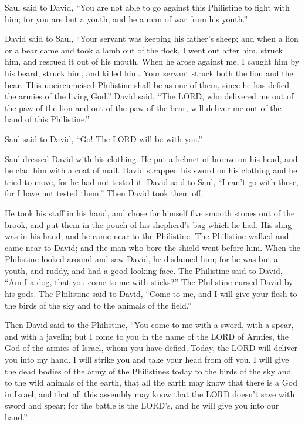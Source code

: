  Saul said to David, ``You are not able to go against this
Philistine to fight with him; for you are but a youth, and he a man of
war from his youth.''

 David said to Saul, ``Your servant was keeping his
father's sheep; and when a lion or a bear came and took a lamb out of
the flock,  I went out after him, struck him, and rescued
it out of his mouth. When he arose against me, I caught him by his
beard, struck him, and killed him.  Your servant struck
both the lion and the bear. This uncircumcised Philistine shall be as
one of them, since he has defied the armies of the living God.''
 David said, ``The LORD, who delivered me out of the paw of
the lion and out of the paw of the bear, will deliver me out of the hand
of this Philistine.''

Saul said to David, ``Go! The LORD will be with you.''

 Saul dressed David with his clothing. He put a helmet of
bronze on his head, and he clad him with a coat of mail. 
David strapped his sword on his clothing and he tried to move, for he
had not tested it. David said to Saul, ``I can't go with these, for I
have not tested them.'' Then David took them off.

 He took his staff in his hand, and chose for himself five
smooth stones out of the brook, and put them in the pouch of his
shepherd's bag which he had. His sling was in his hand; and he came near
to the Philistine.  The Philistine walked and came near to
David; and the man who bore the shield went before him. 
When the Philistine looked around and saw David, he disdained him; for
he was but a youth, and ruddy, and had a good looking face.
 The Philistine said to David, ``Am I a dog, that you come
to me with sticks?'' The Philistine cursed David by his gods.
 The Philistine said to David, ``Come to me, and I will
give your flesh to the birds of the sky and to the animals of the
field.''

 Then David said to the Philistine, ``You come to me with a
sword, with a spear, and with a javelin; but I come to you in the name
of the LORD of Armies, the God of the armies of Israel, whom you have
defied.  Today, the LORD will deliver you into my hand. I
will strike you and take your head from off you. I will give the dead
bodies of the army of the Philistines today to the birds of the sky and
to the wild animals of the earth, that all the earth may know that there
is a God in Israel,  and that all this assembly may know
that the LORD doesn't save with sword and spear; for the battle is the
LORD's, and he will give you into our hand.''

